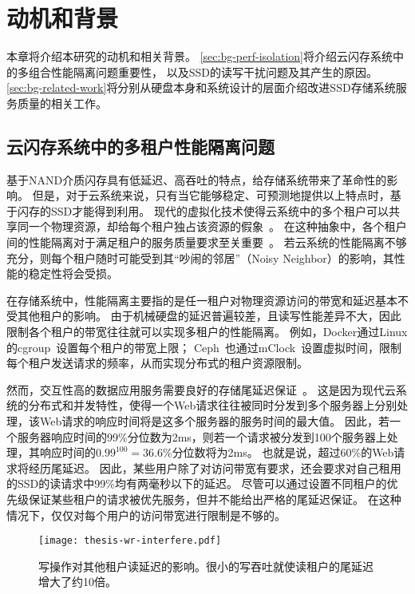 
\chapter{动机和背景}
\label{chap:background}

本章将介绍本研究的动机和相关背景。
\autoref{sec:bg-perf-isolation}将介绍云闪存系统中的多组合性能隔离问题重要性，
以及SSD的读写干扰问题及其产生的原因。
\autoref{sec:bg-related-work}将分别从硬盘本身和系统设计的层面介绍改进SSD存储系统服务质量的相关工作。

\section{云闪存系统中的多租户性能隔离问题}
\label{sec:bg-perf-isolation}

基于NAND介质闪存具有低延迟、高吞吐的特点，给存储系统带来了革命性的影响。
但是，对于云系统来说，只有当它能够稳定、可预测地提供以上特点时，基于闪存的SSD才能得到利用。
现代的虚拟化技术使得云系统中的多个租户可以共享同一个物理资源，却给每个租户独占该资源的假象~\cite{bugnion2017hardware}。
在这种抽象中，各个租户间的性能隔离对于满足租户的服务质量要求至关重要~\cite{somani2009isolation}。
若云系统的性能隔离不够充分，则每个租户随时可能受到其“吵闹的邻居”（Noisy Neighbor）的影响，其性能的稳定性将会受损。

在存储系统中，性能隔离主要指的是任一租户对物理资源访问的带宽和延迟基本不受其他租户的影响。
由于机械硬盘的延迟普遍较差，且读写性能差异不大，因此限制各个租户的带宽往往就可以实现多租户的性能隔离。
例如，Docker通过Linux的cgroup~\cite{cgroup}设置每个租户的带宽上限；
Ceph~\cite{weil2006ceph}也通过mClock~\cite{gulati2010mclock}设置虚拟时间，限制每个租户发送请求的频率，从而实现分布式的租户资源限制。

然而，交互性高的数据应用服务需要良好的存储尾延迟保证~\cite{dean2013tail,hao2016tail}。
这是因为现代云系统的分布式和并发特性，使得一个Web请求往往被同时分发到多个服务器上分别处理，该Web请求的响应时间将是这多个服务器的服务时间的最大值。
因此，若一个服务器响应时间的99\%分位数为2ms，则若一个请求被分发到100个服务器上处理，其响应时间的$0.99^{100}=36.6\%$分位数将为2ms。
也就是说，超过60\%的Web请求将经历尾延迟。
因此，某些用户除了对访问带宽有要求，还会要求对自己租用的SSD的读请求中99\%均有两毫秒以下的延迟。
尽管可以通过设置不同租户的优先级保证某些租户的请求被优先服务，但并不能给出严格的尾延迟保证。
在这种情况下，仅仅对每个用户的访问带宽进行限制是不够的。

\begin{figure}[h]
  \centering
  \texttt{[image: thesis-wr-interfere.pdf]}
  \caption{写操作对其他租户读延迟的影响。很小的写吞吐就使读租户的尾延迟增大了约10倍。}
  \label{fig:bg-wr-interfere}
\end{figure}

